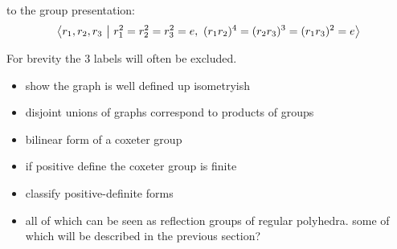 \documentclass[../main.tex]{subfiles}
\begin{document}
to the group presentation: \[
\left\langle r_1,r_2,r_3 \ \middle| \ r_1^2 = r_2^2 = r_3^2 = e, \ (r_1r_2)^4 = (r_2r_3)^3 = (r_1r_3)^2 = e \right\rangle
\]

For brevity the $3$ labels will often  be excluded.

\begin{itemize}
    \item show the graph is well defined up isometryish
    \item disjoint unions of graphs correspond to products of groups
    \item bilinear form of a coxeter group
    \item if positive define the coxeter group is finite
    \item classify positive-definite forms
    \item all of which can be seen as reflection groups of regular polyhedra. some of which will be described in the previous section?
\end{itemize}
\end{document}

